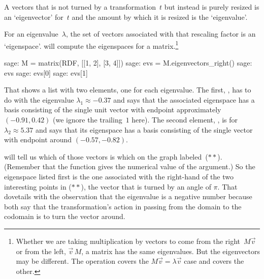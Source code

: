 A vectors that is not turned by a transformation~$t$ but instead
is purely resized 
is an `eigenvector' for~$t$ and the amount by which it is 
resized is the `eigenvalue'.

For an eigenvalue~$\lambda$, the set of vectors associated with
that rescaling factor is an `eigenspace'.
\Sage{} will compute the eigenspaces for a matrix.\footnote{%
  Whether we are taking multiplication 
  by vectors to come from the 
  right~$M\vec{v}$ or from the left, $\vec{v}\,M$, 
  a matrix has the same eigenvalues.  
  But the eigenvectors may be different. 
  The \protect\Sage{} operation \protect{} 
  covers the 
  $M\vec{v}=\lambda\vec{v}$ case and  
  \protect{}
  covers the other.}

\begin{sagecommandline}
sage: M = matrix(RDF, [[1, 2], [3, 4]])
sage: evs = M.eigenvectors_right()
sage: evs
sage: evs[0] 
sage: evs[1]
\end{sagecommandline}
That shows a list with two elements, one for each eigenvalue.
The first, , 
has to do with the eigenvalue $\lambda_1\approx -0.37$ and
says that the associated eigenspace has a basis consisting of the single unit
vector with endpoint approximately $(-0.91, 0.42)$
(we ignore the trailing~$1$ here).
The second element, , 
is for~$\lambda_2\approx 5.37$
and says that its eigenspace
has a basis consisting of the single vector with endpoint around
$(-0.57, -0.82)$. 

\Sage{} will tell us which of those vectors is which on the graph 
labeled~($**$).
(Remember that the  function gives the numerical value of
the argument.)
So the eigenspace listed first is the one associated with the right-hand
of the two interesting points in ($**$), the vector that is turned by an angle
of $\pi$.
That dovetails with the observation that the eigenvalue is a negative number 
because both say that the transformation's action in passing from the
domain to the codomain is to turn the vector around.

